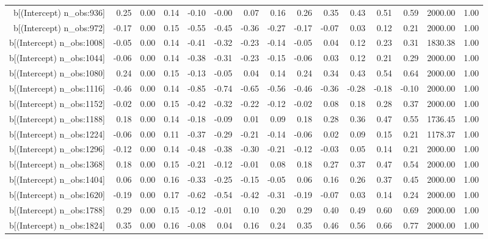 \begin{table}[ht]
\begin{tabular}{rrrrrrrrrrrrrrr}
  b[(Intercept) n\_obs:936] & 0.25 & 0.00 & 0.14 & -0.10 & -0.00 & 0.07 & 0.16 & 0.26 & 0.35 & 0.43 & 0.51 & 0.59 & 2000.00 & 1.00 \\ 
  b[(Intercept) n\_obs:972] & -0.17 & 0.00 & 0.15 & -0.55 & -0.45 & -0.36 & -0.27 & -0.17 & -0.07 & 0.03 & 0.12 & 0.21 & 2000.00 & 1.00 \\ 
  b[(Intercept) n\_obs:1008] & -0.05 & 0.00 & 0.14 & -0.41 & -0.32 & -0.23 & -0.14 & -0.05 & 0.04 & 0.12 & 0.23 & 0.31 & 1830.38 & 1.00 \\ 
  b[(Intercept) n\_obs:1044] & -0.06 & 0.00 & 0.14 & -0.38 & -0.31 & -0.23 & -0.15 & -0.06 & 0.03 & 0.12 & 0.21 & 0.29 & 2000.00 & 1.00 \\ 
  b[(Intercept) n\_obs:1080] & 0.24 & 0.00 & 0.15 & -0.13 & -0.05 & 0.04 & 0.14 & 0.24 & 0.34 & 0.43 & 0.54 & 0.64 & 2000.00 & 1.00 \\ 
  b[(Intercept) n\_obs:1116] & -0.46 & 0.00 & 0.14 & -0.85 & -0.74 & -0.65 & -0.56 & -0.46 & -0.36 & -0.28 & -0.18 & -0.10 & 2000.00 & 1.00 \\ 
  b[(Intercept) n\_obs:1152] & -0.02 & 0.00 & 0.15 & -0.42 & -0.32 & -0.22 & -0.12 & -0.02 & 0.08 & 0.18 & 0.28 & 0.37 & 2000.00 & 1.00 \\ 
  b[(Intercept) n\_obs:1188] & 0.18 & 0.00 & 0.14 & -0.18 & -0.09 & 0.01 & 0.09 & 0.18 & 0.28 & 0.36 & 0.47 & 0.55 & 1736.45 & 1.00 \\ 
  b[(Intercept) n\_obs:1224] & -0.06 & 0.00 & 0.11 & -0.37 & -0.29 & -0.21 & -0.14 & -0.06 & 0.02 & 0.09 & 0.15 & 0.21 & 1178.37 & 1.00 \\ 
  b[(Intercept) n\_obs:1296] & -0.12 & 0.00 & 0.14 & -0.48 & -0.38 & -0.30 & -0.21 & -0.12 & -0.03 & 0.05 & 0.14 & 0.21 & 2000.00 & 1.00 \\ 
  b[(Intercept) n\_obs:1368] & 0.18 & 0.00 & 0.15 & -0.21 & -0.12 & -0.01 & 0.08 & 0.18 & 0.27 & 0.37 & 0.47 & 0.54 & 2000.00 & 1.00 \\ 
  b[(Intercept) n\_obs:1404] & 0.06 & 0.00 & 0.16 & -0.33 & -0.25 & -0.15 & -0.05 & 0.06 & 0.16 & 0.26 & 0.37 & 0.45 & 2000.00 & 1.00 \\ 
  b[(Intercept) n\_obs:1620] & -0.19 & 0.00 & 0.17 & -0.62 & -0.54 & -0.42 & -0.31 & -0.19 & -0.07 & 0.03 & 0.14 & 0.24 & 2000.00 & 1.00 \\ 
  b[(Intercept) n\_obs:1788] & 0.29 & 0.00 & 0.15 & -0.12 & -0.01 & 0.10 & 0.20 & 0.29 & 0.40 & 0.49 & 0.60 & 0.69 & 2000.00 & 1.00 \\ 
  b[(Intercept) n\_obs:1824] & 0.35 & 0.00 & 0.16 & -0.08 & 0.04 & 0.16 & 0.24 & 0.35 & 0.46 & 0.56 & 0.66 & 0.77 & 2000.00 & 1.00 \\ 

\end{tabular}
\end{table}
